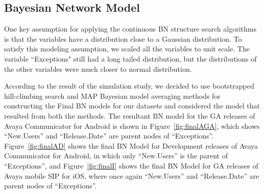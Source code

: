 \documentclass[smallextended]{svjour3}       %
\begin{document}
\begin{table}[ht]
\caption{Summary Result of LR model for ``Exceptions"}\label{t:LR1}
\centering
{}
\vspace{-10pt}
\end{table}


\subsection{Bayesian Network Model}
One key assumption for applying the continuous BN structure search algorithms 
is that the variables have a distribution close to a Gaussian distribution.
To satisfy this modeling assumption, we scaled all the
variables to unit scale. The variable ``Exceptions" still had a long
tailed distribution, but the distributions of the other variables
were much closer to normal distribution.

According to the result of the simulation study, we decided to use bootstrapped hill-climbing search and MAP Bayesian model averaging methods for constructing the Final BN models for our datasets and considered the model that resulted from both the methods. 
The resultant BN model for the GA releases of Avaya Communicator for Android is shown in Figure~\ref{fig:finalAGA}, which shows ``New.Users'' and ``Release.Date'' are parent nodes of ``Exceptions''.  Figure~\ref{fig:finalAD} shows the final BN Model for Development releases of Avaya Communicator for Android, in which only ``New.Users'' is the parent of ``Exceptions'', and Figure~\ref{fig:finalI} shows the final BN Model for GA releases of Avaya mobile SIP for iOS, where once again ``New.Users'' and ``Release.Date'' are parent nodes of ``Exceptions''.
\end{document}
